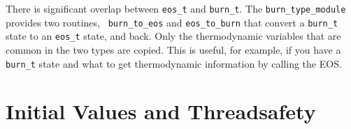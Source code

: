 There is significant overlap between {\tt eos\_t} and {\tt burn\_t}.
The {\tt burn\_type\_module} provides two routines, {\tt
  burn\_to\_eos} and {\tt eos\_to\_burn} that convert a {\tt burn\_t}
state to an {\tt eos\_t} state, and back.  Only the thermodynamic
variables that are common in the two types are copied.  This is
useful, for example, if you have a {\tt burn\_t} state and what to get
thermodynamic information by calling the EOS.


\section{Initial Values and Threadsafety}

